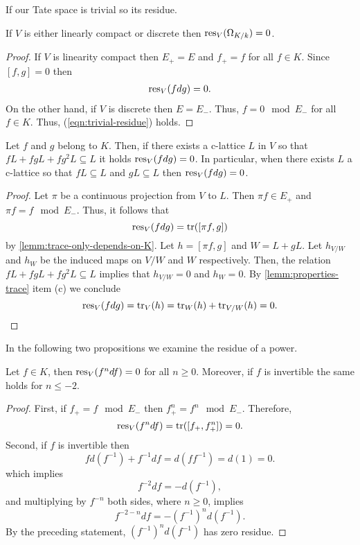 If our Tate space is trivial so its residue.
\begin{proposition}\label{prop:residue-trivial-tate-space}
	If $V$ is either linearly compact or discrete then $\operatorname{res}_{V}(\Omega_{K/k}) = 0$.
\end{proposition}
\begin{proof}
	If $V$ is linearity compact then $E_{+} = E$ and $f_{+} = f$ for all $f \in K$. Since $[f,g] = 0$ then 
	\begin{align}\label{eqn:trivial-residue}
		\operatorname{res}_{V}(fdg) = 0.
	\end{align}
	On the other hand, if $V$ is discrete then $E = E_{-}$. Thus, $f = 0 \mod E_{-}$ for all $f \in K$. Thus, (\ref{eqn:trivial-residue}) holds.
\end{proof}
\begin{proposition}\label{prop:residue-and-continuity}
	Let $f$ and $g$ belong to $K$. Then, if there exists a c-lattice $L$ in $V$ so that $fL + fgL + fg^{2}L \subseteq L$ it holds $\operatorname{res}_{V}(fdg) = 0$. In particular, when there exists $L$ a c-lattice so that $fL \subseteq L$ and $gL \subseteq L$ then $\operatorname{res}_{V}(fdg) = 0$.
\end{proposition}
\begin{proof}
	Let $\pi$ be a continuous projection from $V$ to $L$. Then $\pi f \in E_{+}$ and $\pi f = f \mod E_{-}$. Thus, it follows that
	\[
		\operatorname{res}_{V}(fdg) = \operatorname{tr}([\pi f, g]) 
	\] 
	by \cref{lemm:trace-only-depends-on-K}. Let $h = [\pi f,g]$ and $W = L + gL$. Let $h_{V/W}$ and $h_{W}$ be the induced maps on $V/W$ and $W$ respectively. Then, the relation $fL + fgL + fg^{2}L \subseteq L$ implies that $h_{V/W} = 0$ and $h_{W} = 0$. By \cref{lemm:properties-trace} item (c) we conclude
	\[
		\operatorname{res}_{V}(fdg) = \operatorname{tr}_{V}(h) = \operatorname{tr}_{W}(h) + \operatorname{tr}_{V/W}(h) = 0.
	\]
\end{proof}
In the following two propositions we examine the residue of a power.
\begin{proposition}\label{prop:residue-of-a-power}
	Let $f \in K$, then $\operatorname{res}_{V}(f^{n}df) = 0$ for all $n \geq 0$. Moreover, if $f$ is invertible the same holds for $n \leq -2$.
\end{proposition}
\begin{proof}
	First, if $f_{+} = f \mod E_{-}$ then $f_{+}^{n} = f^{n} \mod E_{-}$. Therefore,
	\[
		\operatorname{res}_{V}(f^{n} df) = \operatorname{tr}([f_{+},f_{+}^{n}]) = 0.
	\]
	Second, if $f$ is invertible then
	\[
		fd(f^{-1}) + f^{-1}df = d(ff^{-1}) = d(1) = 0.
	\]
	which implies 
	\[
	f^{-2}df = -d(f^{-1}),
	\]
	and multiplying by $f^{-n}$ both sides, where $n\geq 0$, implies
	\[
	f^{-2-n}df = -(f^{-1})^{n}d(f^{-1}).
	\]
	By the preceding statement, $(f^{-1})^{n}d(f^{-1})$ has zero residue. 
\end{proof}

